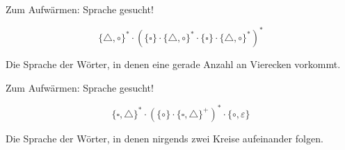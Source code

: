 \begin{frame}{Zum Aufwärmen: Sprache gesucht!}
	
	$$ \{\triangle, \circ\}^* \cdot ( \{\square\} \cdot \{\triangle, \circ\}^* \cdot \{\square\} \cdot \{\triangle, \circ\}^* )^* $$
	\vspace{15mm}
	\pause
	
	Die Sprache der Wörter, in denen eine gerade Anzahl an Vierecken vorkommt.

\end{frame}

\begin{frame}{Zum Aufwärmen: Sprache gesucht!}
	
	$$ \{\square, \triangle\}^* \cdot ( \{\circ\} \cdot \{\square, \triangle\}^+ )^* \cdot \{\circ, \varepsilon\} $$
	\vspace{15mm}
	\pause

	Die Sprache der Wörter, in denen nirgends zwei Kreise aufeinander folgen.
\end{frame}
